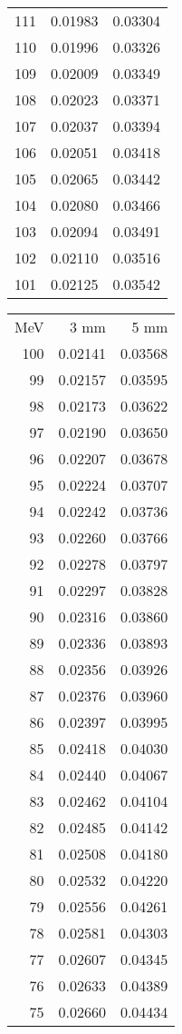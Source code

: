 \documentclass[11pt]{article}
\begin{document}
\begin{minipage}[l]{.3\linewidth}
\begin{tabular}{r|rr}
111&0.01983&0.03304\\ 
110&0.01996&0.03326\\ 
109&0.02009&0.03349\\ 
108&0.02023&0.03371\\ 
107&0.02037&0.03394\\ 
106&0.02051&0.03418\\ 
105&0.02065&0.03442\\ 
104&0.02080&0.03466\\ 
103&0.02094&0.03491\\ 
102&0.02110&0.03516\\ 
101&0.02125&0.03542\\ 
\end{tabular}
\end{minipage}

\newpage
\begin{minipage}[l]{.3\linewidth}
\begin{tabular}{r|rr}
MeV&3 mm&5 mm\\
100&0.02141&0.03568\\ 
99&0.02157&0.03595\\ 
98&0.02173&0.03622\\ 
97&0.02190&0.03650\\ 
96&0.02207&0.03678\\ 
95&0.02224&0.03707\\ 
94&0.02242&0.03736\\ 
93&0.02260&0.03766\\ 
92&0.02278&0.03797\\ 
91&0.02297&0.03828\\ 
90&0.02316&0.03860\\ 
89&0.02336&0.03893\\ 
88&0.02356&0.03926\\ 
87&0.02376&0.03960\\ 
86&0.02397&0.03995\\ 
85&0.02418&0.04030\\ 
84&0.02440&0.04067\\ 
83&0.02462&0.04104\\ 
82&0.02485&0.04142\\ 
81&0.02508&0.04180\\ 
80&0.02532&0.04220\\ 
79&0.02556&0.04261\\ 
78&0.02581&0.04303\\ 
77&0.02607&0.04345\\ 
76&0.02633&0.04389\\ 
75&0.02660&0.04434\\ 

\end{tabular}
\end{minipage}
\end{document}
